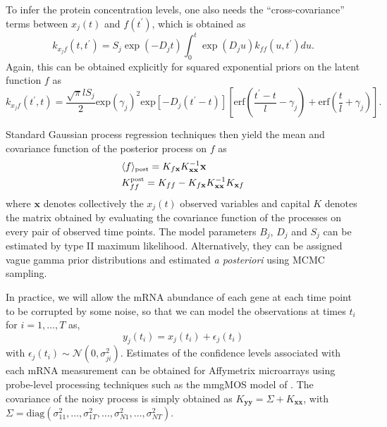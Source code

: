 \documentclass[english]{article}
\begin{document}
To infer the protein concentration levels, one also needs the 
``cross-covariance'' terms between $x_j\left(t\right)$ and 
$f\left(t^{\prime}\right)$, which is obtained as
\begin{equation}k_{x_{j}f}\left(t,t^{\prime}\right) = S_{j}\exp\left(-D_{j}t\right)\int_{0}^{t}\exp\left(D_{j}u\right)k_{ff}\left(u,t^{\prime}\right)du
 .
\end{equation}
Again, this can be obtained explicitly for squared exponential priors on the 
latent function $f$ as\[
k_{x_jf}\left(t^{\prime},t\right) = \frac{\sqrt{\pi}l S_j}{2}
\textrm{exp}\left(\gamma_j\right)^2\textrm{exp}\left[-D_j\left(t^{\prime}-t\right)
\right]\left[\textrm{erf}\left(\frac{t^{\prime}-t}{l}-\gamma_j\right)+
\textrm{erf}\left(\frac{t}{l}+\gamma_j\right)\right].\]
 
Standard Gaussian process regression techniques 
\cite[see \emph{e.g.}][]{Rasmussen:book05} then yield the mean and 
covariance function of the posterior process on $f$ as
\begin{equation}\begin{split}
&\langle f\rangle_{{\textrm{\tiny post}}} = K_{f\mathbf{x}}K_{\mathbf{x}\mathbf{x}}^{-1}\mathbf{x}\\
&K_{ff}^{{\textrm{\tiny post}}} = K_{ff}-K_{f\mathbf{x}}K_{\mathbf{x}\mathbf{x}}^{-1}K_{\mathbf{x}f}\label{posterior}\end{split}
\end{equation}
where $\mathbf{x}$ denotes collectively the $x_j\left(t\right)$ observed 
variables and capital $K$ denotes the matrix obtained by evaluating the
covariance function of the processes on every pair of observed time points.
The model parameters $B_j$, $D_j$ and $S_j$ can be estimated by type II 
maximum likelihood. Alternatively, they can be assigned vague gamma 
prior distributions and estimated \emph{a posteriori} 
using MCMC sampling.

In practice, we will allow the mRNA abundance of each gene at each time point
to be corrupted by some noise, so that we can model the observations at times $t_i$ for $i=1,\ldots,T$ as,
\begin{equation}
y_j\left(t_i\right) = x_j\left(t_i\right)+\epsilon_j\left(t_i\right)
\label{noisyData}\end{equation}
with $\epsilon_j\left(t_i\right)\sim\mathcal{N}\left(0,\sigma^2_{ji}\right)$. 
Estimates of the confidence levels associated with each mRNA measurement
can be obtained for Affymetrix microarrays using probe-level 
processing techniques such as the mmgMOS model of \cite{Liu:mmgMOS05}. 
The covariance of the noisy process is simply obtained as  
$K_{\mathbf{y}\mathbf{y}}=\Sigma+
K_{\mathbf{x}\mathbf{x}}$, with $\Sigma=\textrm{diag}\left(\sigma^2_{11},\ldots,\sigma^2_{1T},\ldots,\sigma^2_{N1},\ldots,\sigma^2_{NT}\right)$.
\end{document}
